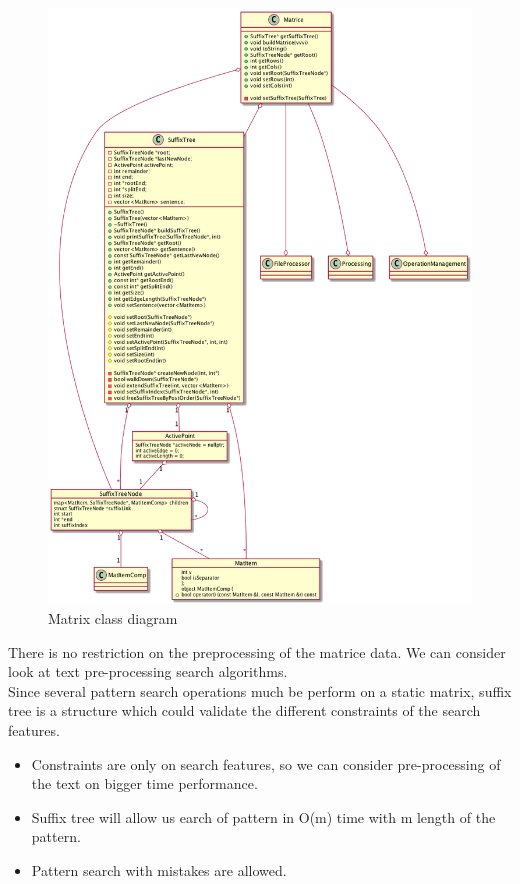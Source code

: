 \begin{figure}[h]
    \begin{center}
        \includegraphics[scale=0.40]{./ressources/graph/matrice.png}
    \end{center}
    \caption{Matrix class diagram}
    \label{Solution - Matrice data structure class diagram}
\end{figure}
\bigskip

\par
There is no restriction on the preprocessing of the matrice data. We can consider look at text pre-processing search algorithms.\\
Since several pattern search operations much be perform on a static matrix, suffix tree is a structure which could validate the different constraints of the search features.\\
\begin{itemize}
	\item Constraints are only on search features, so we can consider pre-processing of the text on bigger time performance.
	\item Suffix tree will allow us earch of pattern in O(m) time with m length of the pattern.
	\item Pattern search with mistakes are allowed.
\end{itemize}

